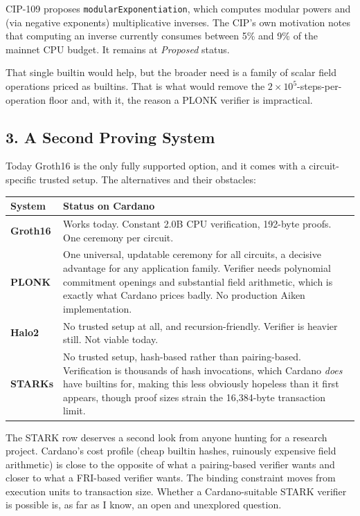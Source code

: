 CIP-109 proposes \texttt{modularExponentiation}, which computes modular powers
and (via negative exponents) multiplicative inverses. The CIP's own
motivation notes that computing an inverse currently consumes between 5\% and
9\% of the mainnet CPU budget. It remains at \emph{Proposed} status.

That single builtin would help, but the broader need is a family of scalar field
operations priced as builtins. That is what would remove the
$2\times10^5$-steps-per-operation floor and, with it, the reason a PLONK verifier
is impractical.

\subsection*{3. A Second Proving System}

Today Groth16 is the only fully supported option, and it comes with a
circuit-specific trusted setup. The alternatives and their obstacles:

\begin{center}
\begin{tabular}{lp{7.4cm}}
  \hline
  \textbf{System} & \textbf{Status on Cardano} \\
  \hline
  \textbf{Groth16}
    & Works today. Constant 2.0B CPU verification, 192-byte proofs. One
      ceremony per circuit. \\
  \addlinespace
  \textbf{PLONK}
    & One universal, updatable ceremony for all circuits, a decisive
      advantage for any application family. Verifier needs polynomial
      commitment openings and substantial field arithmetic, which is exactly
      what Cardano prices badly. No production Aiken implementation. \\
  \addlinespace
  \textbf{Halo2}
    & No trusted setup at all, and recursion-friendly. Verifier is heavier
      still. Not viable today. \\
  \addlinespace
  \textbf{STARKs}
    & No trusted setup, hash-based rather than pairing-based. Verification is
      thousands of hash invocations, which Cardano \emph{does} have builtins
      for, making this less obviously hopeless than it first appears, though
      proof sizes strain the 16{,}384-byte transaction limit. \\
  \hline
\end{tabular}
\end{center}

\begin{remark}
The STARK row deserves a second look from anyone hunting for a research project.
Cardano's cost profile (cheap builtin hashes, ruinously expensive field
arithmetic) is close to the opposite of what a pairing-based verifier wants
and closer to what a FRI-based verifier wants. The binding constraint moves from
execution units to transaction size. Whether a Cardano-suitable STARK verifier
is possible is, as far as I know, an open and unexplored question.
\end{remark}

